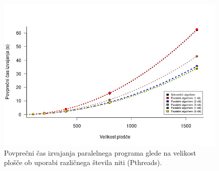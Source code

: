 \documentclass[a4paper,titlepage,11pt]{article}
\begin{document}
\begin{figure}[H]
\begin{center}
\includegraphics[scale=0.55]{graf-rezultati-2_1.png}
\caption{Povprečni čas izvajanja paralelnega programa glede na velikost plošče ob uporabi različnega števila niti (Pthreads).}
\label{graf-rezultati-2}
\end{center}
\vspace{-25pt}
\end{figure}
\end{document}
